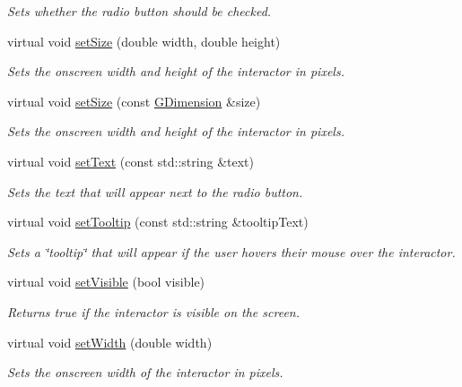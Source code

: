 \begin{DoxyCompactItemize}
\begin{DoxyCompactList}\small\item\em Sets whether the radio button should be checked. \end{DoxyCompactList}\item 
virtual void \mbox{\hyperlink{classsgl_1_1GInteractor_aca25d49481f9bf5fc8f7df4c086c4ce7}{set\+Size}} (double width, double height)
\begin{DoxyCompactList}\small\item\em Sets the onscreen width and height of the interactor in pixels. \end{DoxyCompactList}\item 
virtual void \mbox{\hyperlink{classsgl_1_1GInteractor_ae2b628228f192c2702c4ce941b2af68f}{set\+Size}} (const \mbox{\hyperlink{structsgl_1_1GDimension}{G\+Dimension}} \&size)
\begin{DoxyCompactList}\small\item\em Sets the onscreen width and height of the interactor in pixels. \end{DoxyCompactList}\item 
virtual void \mbox{\hyperlink{classsgl_1_1GRadioButton_ac1ae51949d41ee9054634be5967d91b8}{set\+Text}} (const std\+::string \&text)
\begin{DoxyCompactList}\small\item\em Sets the text that will appear next to the radio button. \end{DoxyCompactList}\item 
virtual void \mbox{\hyperlink{classsgl_1_1GInteractor_a039e0e49beaecc275efce02d416acea8}{set\+Tooltip}} (const std\+::string \&tooltip\+Text)
\begin{DoxyCompactList}\small\item\em Sets a \char`\"{}tooltip\char`\"{} that will appear if the user hovers their mouse over the interactor. \end{DoxyCompactList}\item 
virtual void \mbox{\hyperlink{classsgl_1_1GInteractor_a18e44e30b31525a243960ca3928125aa}{set\+Visible}} (bool visible)
\begin{DoxyCompactList}\small\item\em Returns true if the interactor is visible on the screen. \end{DoxyCompactList}\item 
virtual void \mbox{\hyperlink{classsgl_1_1GInteractor_aa3f3fba4cb131baa8696ba01e3bceca1}{set\+Width}} (double width)
\begin{DoxyCompactList}\small\item\em Sets the onscreen width of the interactor in pixels. \end{DoxyCompactList}\item 

\end{DoxyCompactItemize}
